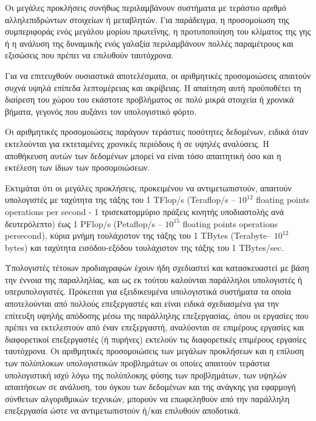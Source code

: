 \documentclass[12pt,a4paper]{article} %
\begin{document}
\begin{enumerate}[label=\Roman*.]
    \begin{sloppypar}
    \item Οι μεγάλες προκλήσεις συνήθως περιλαμβάνουν συστήματα με τεράστιο
    αριθμό αλληλεπιδρώντων στοιχείων ή μεταβλητών. Για παράδειγμα, η
    προσομοίωση της συμπεριφοράς ενός μεγάλου μορίου πρωτεΐνης, η προτυποποίηση
    του κλίματος της γης ή η ανάλυση της δυναμικής ενός γαλαξία περιλαμβάνουν
    πολλές παραμέτρους και εξισώσεις που πρέπει να επιλυθούν ταυτόχρονα.
    \end{sloppypar}

    \begin{sloppypar}
    \item Για να επιτευχθούν ουσιαστικά αποτελέσματα, οι αριθμητικές προσομοιώσεις
    απαιτούν συχνά υψηλά επίπεδα λεπτομέρειας και ακρίβειας. Η απαίτηση αυτή
    προϋποθέτει τη διαίρεση του χώρου του εκάστοτε προβλήματος σε πολύ μικρά
    στοιχεία ή χρονικά βήματα, γεγονός που αυξάνει τον υπολογιστικό φόρτο.
    \end{sloppypar}

    \item Οι αριθμητικές προσομοιώσεις παράγουν τεράστιες ποσότητες δεδομένων,
    ειδικά όταν εκτελούνται για εκτεταμένες χρονικές περιόδους ή σε υψηλές
    αναλύσεις. Η αποθήκευση αυτών των δεδομένων μπορεί να είναι τόσο απαιτητική
    όσο και η εκτέλεση των ίδιων των προσομοιώσεων.
\end{enumerate}

Εκτιμάται ότι οι μεγάλες προκλήσεις, προκειμένου να αντιμετωπιστούν, απαιτούν
υπολογιστές με ταχύτητα της τάξης του 1 TFlop/s (Teraflop/s -- $10^{12}$ floating
points operations per second - 1 τρισεκατομμύριο πράξεις κινητής υποδιαστολής
ανά δευτερόλεπτο) έως 1 PFlop/s (Petaflop/s -- $10^{15}$ floating points operations 
persecond), κύρια μνήμη τουλάχιστον της τάξης του 1 TBytes (Terabyte-- $10^{12}$ bytes)
και ταχύτητα εισόδου-εξόδου τουλάχιστον της τάξης του 1 TBytes/sec.

Υπολογιστές τέτοιων προδιαγραφών έχουν ήδη σχεδιαστεί και κατασκευαστεί
με βάση την έννοια της παραλληλίας, και ως εκ τούτου καλούνται παράλληλοι
υπολογιστές ή υπερυπολογιστές. Πρόκειται για εξειδικευμένα υπολογιστικά συστήματα
τα οποία αποτελούνται από πολλούς επεξεργαστές και είναι ειδικά σχεδιασμένα
για την επίτευξη υψηλής απόδοσης μέσω της παράλληλης επεξεργασίας, όπου
οι εργασίες που πρέπει να εκτελεστούν από έναν επεξεργαστή, αναλύονται σε
επιμέρους εργασίες και διαφορετικοί επεξεργαστές (ή πυρήνες) εκτελούν τις
διαφορετικές επιμέρους εργασίες ταυτόχρονα. Οι αριθμητικές προσομοιώσεις
των μεγάλων προκλήσεων και η επίλυση των πολύπλοκων υπολογιστικών προβλημάτων
οι οποίες απαιτούν τεράστια υπολογιστική ισχύ λόγω της πολύπλοκης φύσης
των προβλημάτων, των υψηλών απαιτήσεων σε ανάλυση, του όγκου των δεδομένων
και της ανάγκης για εφαρμογή σύνθετων αλγοριθμικών τεχνικών, μπορούν να
επωφεληθούν από την παράλληλη επεξεργασία ώστε να αντιμετωπιστούν ή/και
επιλυθούν αποδοτικά.
\vspace{1.00cm}
\end{document}
